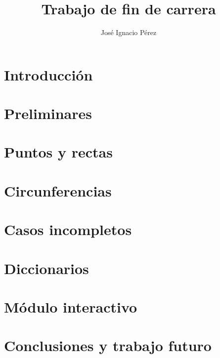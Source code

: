\documentclass[12pt,a4paper,draft]{book}
\author{Jos\'e Ignacio P\'erez}
\title{Trabajo de fin de carrera}
\begin{document}
\newcommand{\codesize}{\small}

\frontmatter
\tableofcontents

\mainmatter
\chapter{Introducción}\label{ch:intro}

\chapter{Preliminares}\label{cap.2}

\chapter{Puntos y rectas}\label{cap.3}

\chapter{Circunferencias}\label{cap.4}

\chapter{Casos incompletos}\label{cap.5}

\chapter{Diccionarios}\label{cap.6}

\chapter{Módulo interactivo}\label{cap.7}

\chapter{Conclusiones y trabajo futuro}\label{cap.8}

\backmatter

\end{document}
